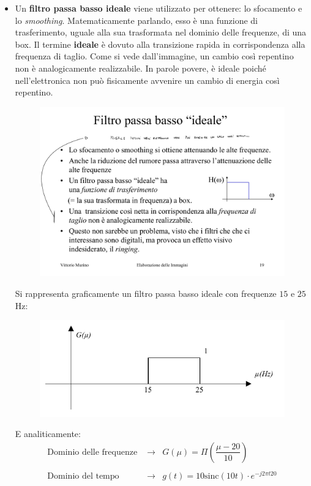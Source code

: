\documentclass[a4paper]{article}
\begin{document}
\begin{itemize}
		\item Un \textbf{filtro passa basso ideale} viene utilizzato per ottenere: lo sfocamento e lo \emph{smoothing}. Matematicamente parlando, esso è una funzione di trasferimento, uguale alla sua trasformata nel dominio delle frequenze, di una box.\newline
		Il termine \textbf{ideale} è dovuto alla transizione rapida in corrispondenza alla frequenza di taglio. Come si vede dall'immagine, un cambio così repentino non è analogicamente realizzabile.\newline
		In parole povere, è ideale poiché nell'elettronica non può fisicamente avvenire un cambio di energia così repentino.\newline
		\begin{figure}[!htp]
			\centering
			\includegraphics[width=.35\textwidth]{img/box_filtro_passa_bassa_ideale.pdf}
		\end{figure}
			
		\noindent
		Si rappresenta graficamente un filtro passa basso ideale con frequenze $15$ e $25$ Hz:
		\begin{figure}[!htp]
			\centering
			\includegraphics[width=.8\textwidth]{img/filtro_passa_basso_ideale_ex.pdf}
		\end{figure}
		
		\noindent
		E analiticamente:
		\begin{equation*}
			\begin{array}{lll}
				\text{Dominio delle frequenze } & \longrightarrow & G\left(\mu\right) = \Pi\left(\dfrac{\mu - 20}{10}\right) \\
				&& \\
				\text{Dominio del tempo } & \longrightarrow & g\left(t\right) = 10\mathrm{sinc}\left(10t\right) \cdot e^{-j 2 \pi t 20}
			\end{array}
		\end{equation*}
	\end{itemize}\newpage
	
\end{document}
